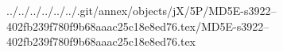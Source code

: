 ../../../../../../.git/annex/objects/jX/5P/MD5E-s3922--402fb239f780f9b68aaac25c18e8ed76.tex/MD5E-s3922--402fb239f780f9b68aaac25c18e8ed76.tex